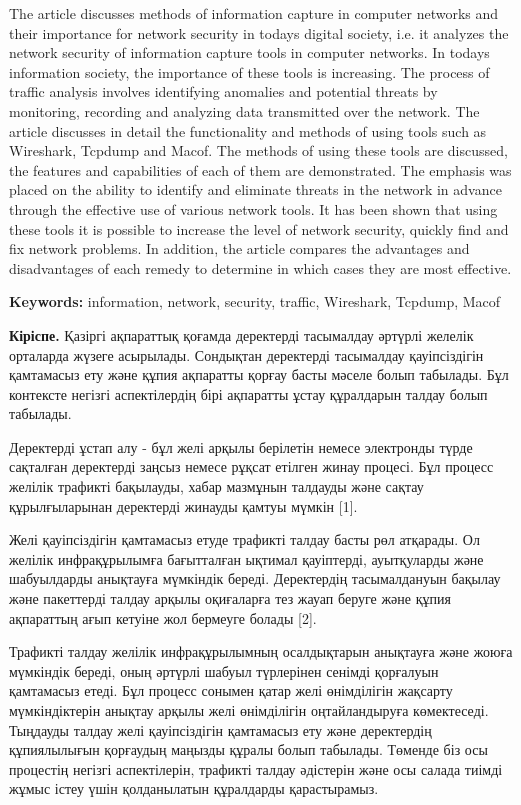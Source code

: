 The article discusses methods of information capture in computer
networks and their importance for network security in
today\textquotesingle s digital society, i.e. it analyzes the network
security of information capture tools in computer networks. In
today\textquotesingle s information society, the importance of these
tools is increasing. The process of traffic analysis involves
identifying anomalies and potential threats by monitoring, recording and
analyzing data transmitted over the network. The article discusses in
detail the functionality and methods of using tools such as Wireshark,
Tcpdump and Macof. The methods of using these tools are discussed, the
features and capabilities of each of them are demonstrated. The emphasis
was placed on the ability to identify and eliminate threats in the
network in advance through the effective use of various network tools.
It has been shown that using these tools it is possible to increase the
level of network security, quickly find and fix network problems. In
addition, the article compares the advantages and disadvantages of each
remedy to determine in which cases they are most effective.

\textbf{Keywords:} information, network, security, traffic, Wireshark,
Tcpdump, Macof

\textbf{Кіріспе.} Қазіргі ақпараттық қоғамда деректерді тасымалдау
әртүрлі желелік орталарда жүзеге асырылады. Сондықтан деректерді
тасымалдау қауіпсіздігін қамтамасыз ету және құпия ақпаратты қорғау
басты мәселе болып табылады. Бұл контексте негізгі аспектілердің бірі
ақпаратты ұстау құралдарын талдау болып табылады.

Деректерді ұстап алу - бұл желі арқылы берілетін немесе электронды түрде
сақталған деректерді заңсыз немесе рұқсат етілген жинау процесі. Бұл
процесс желілік трафикті бақылауды, хабар мазмұнын талдауды және сақтау
құрылғыларынан деректерді жинауды қамтуы мүмкін {[}1{]}.

Желі қауіпсіздігін қамтамасыз етуде трафикті талдау басты рөл атқарады.
Ол желілік инфрақұрылымға бағытталған ықтимал қауіптерді, ауытқуларды
және шабуылдарды анықтауға мүмкіндік береді. Деректердің тасымалдануын
бақылау және пакеттерді талдау арқылы оқиғаларға тез жауап беруге және
құпия ақпараттың ағып кетуіне жол бермеуге болады {[}2{]}.

Трафикті талдау желілік инфрақұрылымның осалдықтарын анықтауға және
жоюға мүмкіндік береді, оның әртүрлі шабуыл түрлерінен сенімді қорғалуын
қамтамасыз етеді. Бұл процесс сонымен қатар желі өнімділігін жақсарту
мүмкіндіктерін анықтау арқылы желі өнімділігін оңтайландыруға
көмектеседі. Тыңдауды талдау желі қауіпсіздігін қамтамасыз ету және
деректердің құпиялылығын қорғаудың маңызды құралы болып табылады.
Төменде біз осы процестің негізгі аспектілерін, трафикті талдау
әдістерін және осы салада тиімді жұмыс істеу үшін қолданылатын
құралдарды қарастырамыз.

